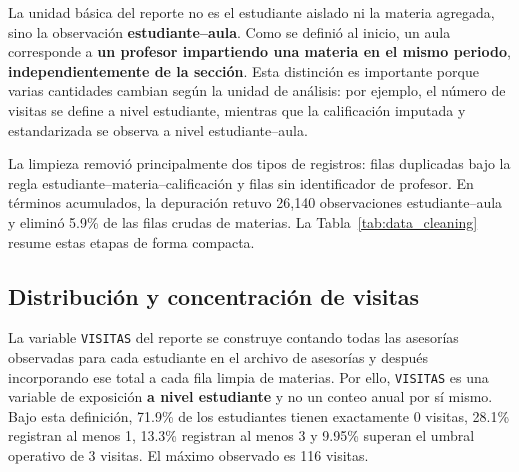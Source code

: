 \documentclass[10pt,letterpaper]{article} %
\numberwithin{figure}{subsection}
\begin{document}


La unidad básica del reporte no es el estudiante aislado ni la materia agregada, sino la observación \textbf{estudiante--aula}. Como se definió al inicio, un aula corresponde a \textbf{un profesor impartiendo una materia en el mismo periodo}, \textbf{independientemente de la sección}. Esta distinción es importante porque varias cantidades cambian según la unidad de análisis: por ejemplo, el número de visitas se define a nivel estudiante, mientras que la calificación imputada y estandarizada se observa a nivel estudiante--aula.

\begin{table}[!htbp]
    \centering
    \caption{Conteos básicos del conjunto analítico utilizado en el reporte.}
    \label{tab:data_core_counts}
    
\end{table}

La limpieza removió principalmente dos tipos de registros: filas duplicadas bajo la regla estudiante--materia--calificación y filas sin identificador de profesor. En términos acumulados, la depuración retuvo 26{,}140 observaciones estudiante--aula y eliminó 5.9\% de las filas crudas de materias. La Tabla~\ref{tab:data_cleaning} resume estas etapas de forma compacta.

\begin{table}[!htbp]
    \centering
    \caption{Resumen de los pasos de limpieza recuperables a partir del proceso actual.}
    \label{tab:data_cleaning}
    
\end{table}

\subsection{Distribución y concentración de visitas}
La variable \texttt{VISITAS} del reporte se construye contando todas las asesorías observadas para cada estudiante en el archivo de asesorías y después incorporando ese total a cada fila limpia de materias. Por ello, \texttt{VISITAS} es una variable de exposición \textbf{a nivel estudiante} y no un conteo anual por sí mismo. Bajo esta definición, 71.9\% de los estudiantes tienen exactamente 0 visitas, 28.1\% registran al menos 1, 13.3\% registran al menos 3 y 9.95\% superan el umbral operativo de 3 visitas. El máximo observado es 116 visitas.
\end{document}
